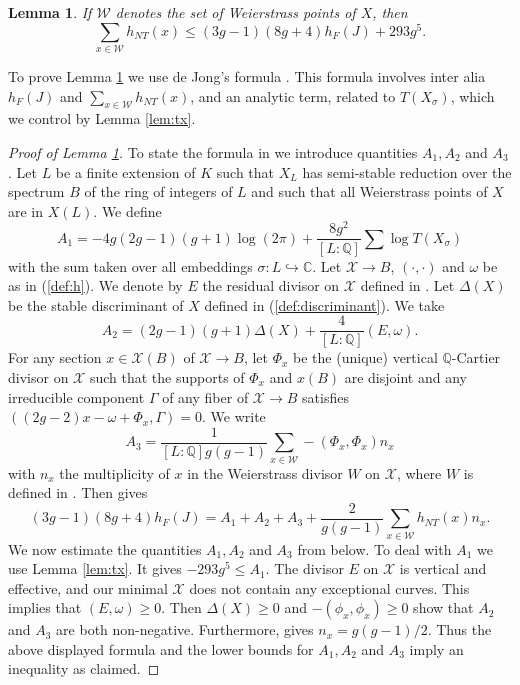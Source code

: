 \documentclass[11pt]{article}
\newtheorem{lemma}[theorem]{Lemma}
\numberwithin{equation}{section}
\newcommand {\QQ}  {{\mathbb Q}}
\newcommand {\p} {x}
\begin{document}
\begin{lemma}\label{lem:wpf}
 If $\mathcal W$ denotes the set of Weierstrass points of $X$, then $$\sum_{\p\in \mathcal W}h_{NT}(\p)\leq (3g-1)(8g+4)h_F(J)+293g^5.$$
\end{lemma}
To prove  Lemma \ref{lem:wpf} we use de Jong's formula \cite[Theorem 4.3]{dejong:weierstrasspoints}. This formula involves inter alia $h_F(J)$ and $\sum_{\p\in \mathcal W}h_{NT}(\p)$, and an analytic term, related to $T(X_\sigma)$, which we control by Lemma \ref{lem:tx}.
\begin{proof}[Proof of Lemma \ref{lem:wpf}]
To state the formula in \cite[Theorem 4.3]{dejong:weierstrasspoints} we introduce quantities $A_1,A_2$ and $A_3$. 
Let $L$ be a finite extension  of $K$ such that $X_L$ has semi-stable reduction over the spectrum $B$ of the ring of integers of $L$ and such that all Weierstrass points of $X$ are in $X(L)$. 
We define
$$A_1=-4g(2g-1)(g+1)\log(2\pi)+\frac{8g^2}{[L:\QQ]}\sum\log T(X_\sigma)$$
with the sum taken over all embeddings $\sigma:L\hookrightarrow \mathbb C.$ Let $\mathcal X\to B$, $(\cdot,\cdot)$  and  $\omega$ be as in (\ref{def:h}). 
We denote by  $E$  the residual divisor on $\mathcal X$ defined in \cite[p.286]{dejong:weierstrasspoints}. Let $\Delta(X)$ be  the stable discriminant of $X$ defined in (\ref{def:discriminant}).
We take $$A_2=(2g-1)(g+1)\Delta(X)+\frac{4}{[L:\QQ]}(E,\omega).$$
For any section $\p\in \mathcal X(B)$ of $\mathcal X\to B$,  let $\Phi_\p$ be the (unique) vertical $\QQ$-Cartier divisor on $\mathcal X$ such that the supports of $\Phi_\p$ and $\p(B)$ are disjoint and  any irreducible component $\Gamma$ of any fiber of $\mathcal X\to B$ satisfies $((2g-2)x-\omega+\Phi_\p,\Gamma)=0$.
We write $$A_3=\frac{1}{[L:\QQ]g(g-1)}\sum_{\p\in \mathcal W}-(\Phi_\p,\Phi_\p)n_\p$$
with $n_\p$ the multiplicity of $\p$ in the Weierstrass divisor $W$   on $\mathcal X$, where $W$  is defined in \cite[p.286]{dejong:weierstrasspoints}. 
Then \cite[Theorem 4.3]{dejong:weierstrasspoints} gives
$$(3g-1)(8g+4)h_F(J)=A_1+A_2+A_3+\frac{2}{g(g-1)}\sum_{\p\in \mathcal W} h_{NT}(\p)n_\p.$$
We now estimate the quantities $A_1,A_2$ and $A_3$ from below. To deal with $A_1$ we use Lemma \ref{lem:tx}. It gives 
$-293g^5\leq A_1.$ 
The divisor $E$ on $\mathcal X$ is vertical and effective, and our minimal  $\mathcal X$ does not contain any exceptional curves. This implies that $(E,\omega)\geq 0$. Then $\Delta(X)\geq 0$ and $-(\phi_\p,\phi_\p)\geq 0$ show that $A_2$ and $A_3$ are both non-negative. Furthermore,  \cite[Lemma 3.2]{dejong:weierstrasspoints}  gives $n_x=g(g-1)/2$. Thus the above displayed formula and the lower bounds for $A_1,A_2$ and $A_3$ imply an inequality as claimed.
\end{proof}
 
\end{document}
